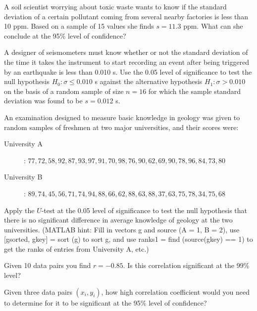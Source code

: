 \begin{problem}
A soil scientist worrying about toxic waste wants to know if the standard deviation of a certain pollutant
coming from several nearby factories is less than 10 ppm.  Based on a sample of 15 values she finds
$s = 11.3$ ppm.  What can she conclude at the 95\% level of confidence?
\end{problem}

\begin{problem}
A designer of seismometers must know whether or not the standard deviation of
the time it takes the instrument to start recording an event after being triggered by
an earthquake is less than 0.010 s.  Use the 0.05 level of significance to test the
null hypothesis $H_0: \sigma \leq 0.010$ s against the alternative hypothesis
$H_1: \sigma > 0.010$ on the basis of a random sample of size $n = 16$ for which the
sample standard deviation was found to be $s = 0.012$ s.
\end{problem}

\begin{problem}
An examination designed to measure basic knowledge in geology was given to random samples
of freshmen at two major universities, and their scores were:
\begin{description}
\item [University A]: $77, 72, 58, 92, 87, 93, 97, 91, 70, 98, 76, 90, 62, 69, 90, 78, 96, 84, 73, 80$
\item [University B]: $89, 74, 45, 56, 71, 74, 94, 88, 66, 62, 88, 63, 88, 37, 63, 75, 78, 34, 75, 68$
\end{description}
Apply the $U$-test at the 0.05 level of significance to test the null hypothesis that there
is no significant difference in average knowledge of geology at the two universities.
(MATLAB hint: Fill in vectors g and source (A = 1, B = 2), use [gsorted, gkey] = sort (g)
to sort g, and use ranks1 = find (source(gkey) == 1) to get the ranks of entries from University A, etc.)
\end{problem}

\begin{problem}
Given 10 data pairs you find $r = -0.85$.  Is this correlation significant at the 99\% level?
\end{problem}

\begin{problem}
Given three data pairs $(x_i, y_i)$, how high correlation coefficient would you need to determine for it to be significant at the 95\% level of confidence?
\end{problem}

